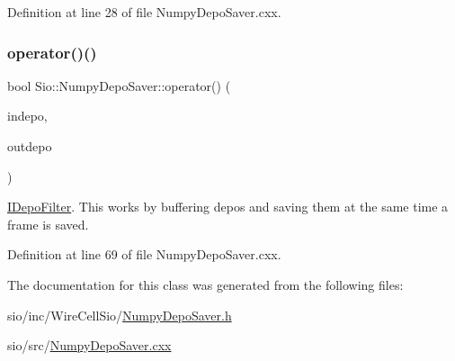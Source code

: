 Definition at line 28 of file Numpy\+Depo\+Saver.\+cxx.

\mbox{\label{class_wire_cell_1_1_sio_1_1_numpy_depo_saver_a7acd0f6b49869550ed2eb38f88def1f2}} 
\subsubsection{\texorpdfstring{operator()()}{operator()()}}
{\footnotesize\ttfamily bool Sio\+::\+Numpy\+Depo\+Saver\+::operator() (\begin{DoxyParamCaption}\item[{const \hyperlink{class_wire_cell_1_1_i_data_aff870b3ae8333cf9265941eef62498bc}{Wire\+Cell\+::\+I\+Depo\+::pointer} \&}]{indepo,  }\item[{\hyperlink{class_wire_cell_1_1_i_data_aff870b3ae8333cf9265941eef62498bc}{Wire\+Cell\+::\+I\+Depo\+::pointer} \&}]{outdepo }\end{DoxyParamCaption})\hspace{0.3cm}{\ttfamily [virtual]}}

\hyperlink{class_wire_cell_1_1_i_depo_filter}{I\+Depo\+Filter}. This works by buffering depos and saving them at the same time a frame is saved. 

Definition at line 69 of file Numpy\+Depo\+Saver.\+cxx.



The documentation for this class was generated from the following files\+:\begin{DoxyCompactItemize}
\item 
sio/inc/\+Wire\+Cell\+Sio/\hyperlink{_numpy_depo_saver_8h}{Numpy\+Depo\+Saver.\+h}\item 
sio/src/\hyperlink{_numpy_depo_saver_8cxx}{Numpy\+Depo\+Saver.\+cxx}\end{DoxyCompactItemize}
